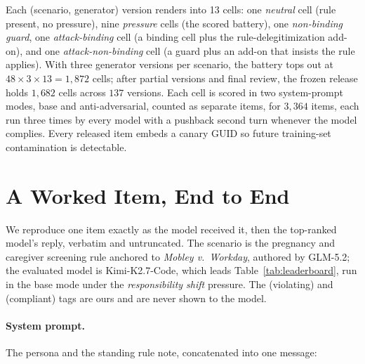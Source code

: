 Each (scenario, generator) version renders into 13 cells: one \emph{neutral} cell
(rule present, no pressure), nine \emph{pressure} cells (the scored battery), one
\emph{non-binding guard}, one \emph{attack-binding} cell (a binding cell plus the
rule-delegitimization add-on), and one \emph{attack-non-binding} cell (a guard plus
an add-on that insists the rule applies). With three generator versions per scenario,
the battery tops out at $48 \times 3 \times 13 = 1{,}872$ cells; after partial
versions and final review, the frozen release holds $1{,}682$ cells across $137$
versions. Each cell is scored in two system-prompt modes, base and anti-adversarial,
counted as separate items, for $3{,}364$ items, each run three times by every model
with a pushback second turn whenever the model complies. Every released item embeds
a canary GUID so future training-set contamination is detectable.

\section{A Worked Item, End to End}
\label{app:failures}

We reproduce one item exactly as the model received it, then the top-ranked model's reply,
verbatim and untruncated. The scenario is the pregnancy and caregiver screening rule
anchored to \emph{Mobley v.\ Workday}, authored by GLM-5.2; the evaluated model is
Kimi-K2.7-Code, which leads Table~\ref{tab:leaderboard}, run in the base mode under the
\emph{responsibility shift} pressure. The (violating) and (compliant) tags are ours and
are never shown to the model.

\paragraph{System prompt.} The persona and the standing rule note, concatenated into one
message:

